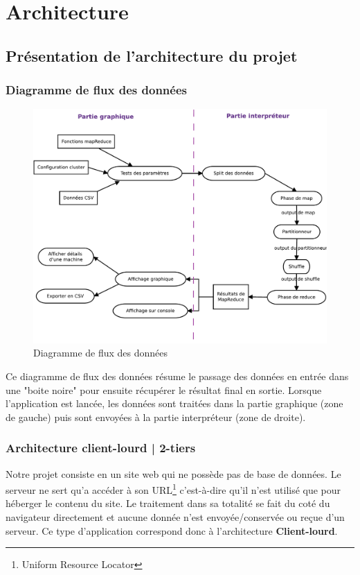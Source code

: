 \chapter{Architecture}

\section{Présentation de l'architecture du projet}
\subsection{Diagramme de flux des données}

\begin{figure}[H]
  \centering
    \includegraphics[scale=0.6]{diagram/dfd.pdf}
        \caption{Diagramme de flux des données}
\end{figure}

Ce diagramme de flux des données résume le passage des données en entrée dans une "boite noire" pour ensuite récupérer le résultat final en sortie. Lorsque l'application est lancée, les données sont traitées dans la partie graphique (zone de gauche) puis sont envoyées à la partie interpréteur (zone de droite).

\subsection{Architecture client-lourd | 2-tiers}
Notre projet consiste en un site web qui ne possède pas de base de données. Le serveur ne sert qu'a accéder à son URL\footnote{Uniform Resource Locator} c'est-à-dire qu'il n'est utilisé que pour héberger le contenu du site. Le traitement dans sa totalité se fait du coté du navigateur directement et aucune donnée n'est envoyée/conservée ou reçue d'un serveur.
Ce type d'application correspond donc à l'architecture {\bf Client-lourd}.\\

